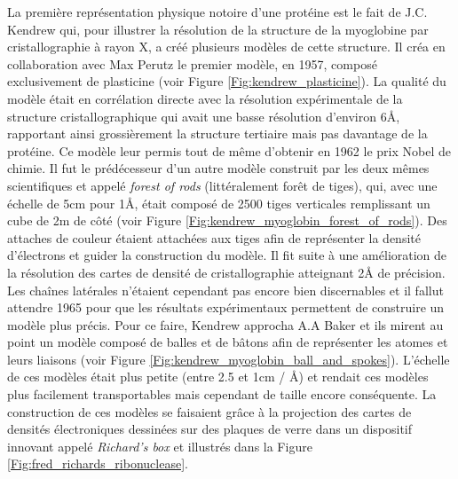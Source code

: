 
La première représentation physique notoire d'une protéine est le fait de J.C. Kendrew qui, pour illustrer la résolution de la structure de la myoglobine par cristallographie \cite{kendrew1958three} à rayon X, a créé plusieurs modèles de cette structure. Il créa en collaboration avec Max Perutz le premier modèle, en 1957, composé exclusivement de plasticine (voir Figure \ref{Fig:kendrew_plasticine}). La qualité du modèle était en corrélation directe avec la résolution expérimentale de la structure cristallographique qui avait une basse résolution d'environ 6\r{A}, rapportant ainsi grossièrement la structure tertiaire mais pas davantage de la protéine. Ce modèle leur permis tout de même d'obtenir en 1962 le prix Nobel de chimie. Il fut le prédécesseur d'un autre modèle construit par les deux mêmes scientifiques et appelé \textit{forest of rods} (littéralement forêt de tiges), qui, avec une échelle de 5cm pour 1\r{A}, était composé de 2500 tiges verticales remplissant un cube de 2m de côté (voir Figure \ref{Fig:kendrew_myoglobin_forest_of_rods}). Des attaches de couleur étaient attachées aux tiges afin de représenter la densité d'électrons et guider la construction du modèle. Il fit suite à une amélioration de la résolution des cartes de densité de cristallographie atteignant 2\r{A} de précision. Les chaînes latérales n'étaient cependant pas encore bien discernables et il fallut attendre 1965 pour que les résultats expérimentaux permettent de construire un modèle plus précis. Pour ce faire, Kendrew approcha A.A Baker et ils mirent au point un modèle composé de balles et de bâtons afin de représenter les atomes et leurs liaisons (voir Figure \ref{Fig:kendrew_myoglobin_ball_and_spokes}). L'échelle de ces modèles était plus petite (entre 2.5 et 1cm / \r{A}) et rendait ces modèles plus facilement transportables mais cependant de taille encore conséquente. La construction de ces modèles se faisaient grâce à la projection des cartes de densités électroniques dessinées sur des plaques de verre dans un dispositif innovant appelé \textit{Richard's box} et illustrés dans la Figure \ref{Fig:fred_richards_ribonuclease}.

